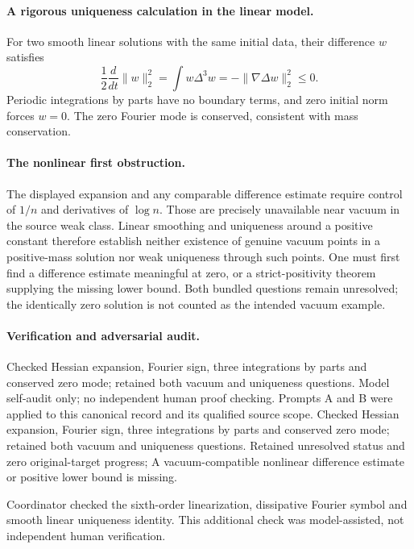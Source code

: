 \documentclass[11pt]{article}
\begin{document}
\paragraph{A rigorous uniqueness calculation in the linear model.} For two smooth linear solutions with the same initial data, their difference $w$ satisfies
\[
 \frac12\frac d{dt}\|w\|_2^2=\int w\Delta^3w=-\|\nabla\Delta w\|_2^2\leq0.
\]
Periodic integrations by parts have no boundary terms, and zero initial norm forces $w=0$. The zero Fourier mode is conserved, consistent with mass conservation.

\paragraph{The nonlinear first obstruction.} The displayed expansion and any comparable difference estimate require control of $1/n$ and derivatives of $\log n$. Those are precisely unavailable near vacuum in the source weak class. Linear smoothing and uniqueness around a positive constant therefore establish neither existence of genuine vacuum points in a positive-mass solution nor weak uniqueness through such points. One must first find a difference estimate meaningful at zero, or a strict-positivity theorem supplying the missing lower bound. Both bundled questions remain unresolved; the identically zero solution is not counted as the intended vacuum example.

\paragraph{Verification and adversarial audit.}
Checked Hessian expansion, Fourier sign, three integrations by parts and conserved zero mode; retained both vacuum and uniqueness questions. Model self-audit only; no independent human proof checking. Prompts A and B were applied to this canonical record and its qualified source scope. Checked Hessian expansion, Fourier sign, three integrations by parts and conserved zero mode; retained both vacuum and uniqueness questions. Retained unresolved status and zero original-target progress; A vacuum-compatible nonlinear difference estimate or positive lower bound is missing.

Coordinator checked the sixth-order linearization, dissipative Fourier symbol and smooth linear uniqueness identity. This additional check was model-assisted, not independent human verification.
\end{document}
